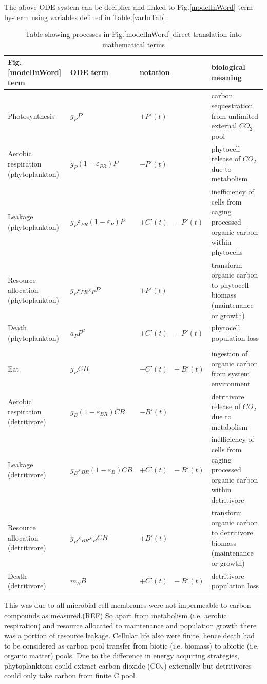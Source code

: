 \documentclass[../thesis.tex]{subfiles} %
\newcommand{\gP}{g_P}
\newcommand{\eP}{\varepsilon_P}
\newcommand{\aP}{a_P}
\newcommand{\ePR}{\varepsilon_{PR}}
\newcommand{\gB}{g_B}
\newcommand{\eB}{\varepsilon_B}
\newcommand{\mB}{m_B}
\newcommand{\eBR}{\varepsilon_{BR}}
\begin{document}
The above ODE system can be decipher and linked to Fig.\ref{modelInWord} term-by-term using variables defined in Table.\ref{varInTab}:

\begin{table}[H]
    \centering
    \caption[Processes in algebra terms]{Table showing processes in Fig.\ref{modelInWord} direct translation into mathematical terms}
    \begin{tabular}{p{.25\linewidth}p{.2\linewidth}p{.2\linewidth}p{.25\linewidth}}\hline
        Fig.\ref{modelInWord} term & ODE term & notation & biological meaning\\\hline
        Photosynthesis &$\gP P$& $+P'(t)$ & carbon sequestration from unlimited external $CO_2$ pool\\
        Aerobic respiration (phytoplankton) &$\gP(1-\ePR)P$& $-P'(t)$ & phytocell release of $CO_2$ due to metabolism\\
        Leakage (phytoplankton) &$\gP\ePR(1-\eP)P$& $+C'(t)\text{ }-P'(t)$ & inefficiency of cells from caging processed organic carbon within phytocells\\
        Resource allocation (phytoplankton) &$\gP\ePR\eP P$& $+P'(t)$ & transform organic carbon to phytocell biomass (maintenance or growth)\\
        Death (phytoplankton) &$\aP P^2$& $+C'(t)\text{ }-P'(t)$ & phytocell population loss\\
        &&&\\
        Eat &$\gB CB$& $-C'(t)\text{ }+B'(t)$ & ingestion of organic carbon from system environment\\
        Aerobic respiration (detritivore) &$\gB(1-\eBR)CB$& $-B'(t)$ & detritivore release of $CO_2$ due to metabolism\\
        Leakage (detritivore) &$\gB\eBR(1-\eB)CB$& $+C'(t)\text{ }-B'(t)$ & inefficiency of cells from caging processed organic carbon within detritivore\\
        Resource allocation (detritivore) &$\gB\eBR\eB CB$& $+B'(t)$ & transform organic carbon to detritivore biomass (maintenance or growth)\\
        Death (detritivore) &$\mB B$& $+C'(t)\text{ }-B'(t)$ & detritivore population loss\\\hline
    \end{tabular}
    \label{termInTab}
\end{table}

This was due to all microbial cell membranes were not impermeable to carbon compounds as measured.(REF)  So apart from metabolism (i.e. aerobic respiration) and resource allocated to maintenance and population growth there was a portion of resource leakage.  Cellular life also were finite, hence death had to be considered as carbon pool transfer from biotic (i.e. biomass) to abiotic (i.e. organic matter) pools.  Due to the difference in energy acquiring strategies, phytoplanktons could extract carbon dioxide (CO$_2$) externally but detritivores could only take carbon from finite C pool.
\end{document}

